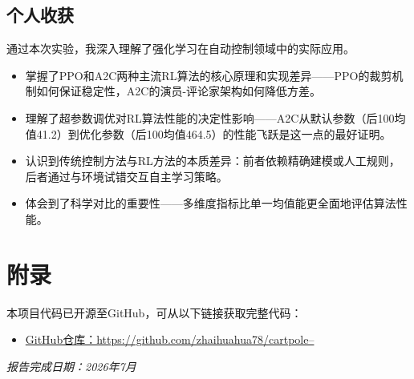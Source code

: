 \documentclass[12pt,a4paper]{ctexart}
\begin{document}
\subsection{个人收获}

通过本次实验，我深入理解了强化学习在自动控制领域中的实际应用。

\begin{itemize}[nosep]
    \item 掌握了PPO和A2C两种主流RL算法的核心原理和实现差异——PPO的裁剪机制如何保证稳定性，A2C的演员-评论家架构如何降低方差。
    \item 理解了超参数调优对RL算法性能的决定性影响——A2C从默认参数（后100均值41.2）到优化参数（后100均值464.5）的性能飞跃是这一点的最好证明。
    \item 认识到传统控制方法与RL方法的本质差异：前者依赖精确建模或人工规则，后者通过与环境试错交互自主学习策略。
    \item 体会到了科学对比的重要性——多维度指标比单一均值能更全面地评估算法性能。
\end{itemize}

\section{附录}

本项目代码已开源至GitHub，可从以下链接获取完整代码：

\begin{itemize}[nosep]
    \item \href{https://github.com/zhaihuahua78/cartpole--}{GitHub仓库：https://github.com/zhaihuahua78/cartpole--}
\end{itemize}

\vspace{0.3cm}
\noindent\textit{报告完成日期：2026年7月}
\end{document}
